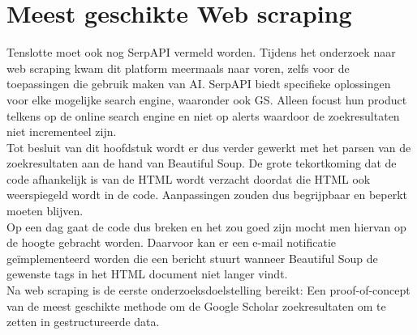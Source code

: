 \section{Meest geschikte Web scraping}
Tenslotte moet ook nog SerpAPI \autocite{Serpapi2025} vermeld worden. Tijdens het onderzoek naar web scraping kwam dit platform meermaals naar voren, zelfs voor de toepassingen die gebruik maken van AI. SerpAPI biedt specifieke oplossingen voor elke mogelijke search engine, waaronder ook GS. Alleen focust hun product telkens op de online search engine en niet op alerts waardoor de zoekresultaten niet incrementeel zijn.\\
Tot besluit van dit hoofdstuk wordt er dus verder gewerkt met het parsen van de zoekresultaten aan de hand van Beautiful Soup. De grote tekortkoming dat de code afhankelijk is van de HTML wordt verzacht doordat die HTML ook weerspiegeld wordt in de code. Aanpassingen zouden dus begrijpbaar en beperkt moeten blijven.\\
Op een dag gaat de code dus breken en het zou goed zijn mocht men hiervan op de hoogte gebracht worden. Daarvoor kan er een e-mail notificatie geïmplementeerd worden die een bericht stuurt wanneer Beautiful Soup de gewenste tags in het HTML document niet langer vindt.\\
Na web scraping is de eerste onderzoeksdoelstelling bereikt: Een proof-of-concept van de meest geschikte methode om de Google Scholar zoekresultaten om te zetten in gestructureerde data.
